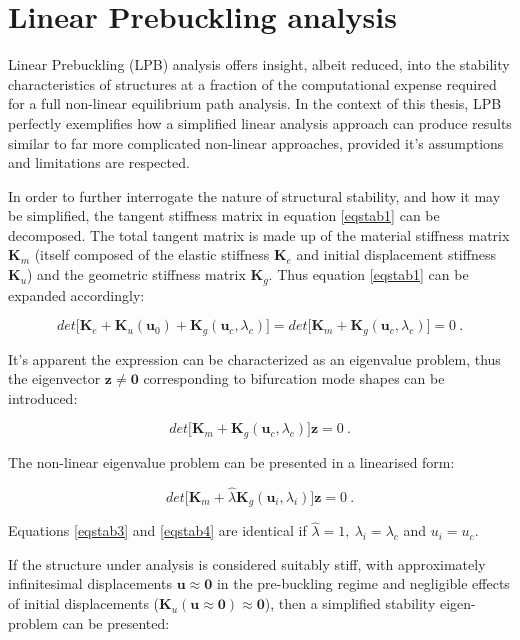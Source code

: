 \section{Linear Prebuckling analysis}
Linear Prebuckling (LPB) analysis offers insight, albeit reduced, into the stability characteristics of structures at a fraction of the computational expense required for a full non-linear equilibrium path analysis. In the context of this thesis, LPB perfectly exemplifies how a simplified linear analysis approach can produce results similar to far more complicated non-linear approaches, provided it's assumptions and limitations are respected.

In order to further interrogate the nature of structural stability, and how it may be simplified, the tangent stiffness matrix in equation \ref{eqstab1} can be decomposed. The total tangent matrix is made up of the material stiffness matrix $\mathbf{K}_m$ (itself composed of the elastic stiffness $\mathbf{K}_e$ and initial displacement stiffness $\mathbf{K}_u$) and the geometric stiffness matrix $\mathbf{K}_g$. Thus equation \ref{eqstab1} can be expanded accordingly:

\begin{equation} 
det\big[
\mathbf{K}_e +
\mathbf{K}_u(\mathbf{u}_0) +
\mathbf{K}_g(\mathbf{u}_c,\lambda_c)
\big] = 
det\big[
\mathbf{K}_m +
\mathbf{K}_g(\mathbf{u}_c,\lambda_c)
\big] = 0
\label{eqstab2}\ .
\end{equation}

It's apparent the expression can be characterized as an eigenvalue problem, thus the eigenvector $\mathbf{z} \neq \mathbf{0}$ corresponding to bifurcation mode shapes can be introduced:

\begin{equation} 
det\big[
\mathbf{K}_m +
\mathbf{K}_g(\mathbf{u}_c,\lambda_c)
\big]\mathbf{z} = 0
\label{eqstab3}\ .
\end{equation}

The non-linear eigenvalue problem can be presented in a linearised form:

\begin{equation} 
det\big[
\mathbf{K}_m +
\hat{\lambda}
\mathbf{K}_g(\mathbf{u}_i,\lambda_i)
\big]\mathbf{z} = 0
\label{eqstab4}\ .
\end{equation}

Equations \ref{eqstab3} and \ref{eqstab4} are identical if $\hat{\lambda}
 = 1,\ \lambda_i = \lambda_c$ and $u_i = u_c$.
 
 If the structure under analysis is considered suitably stiff, with approximately infinitesimal displacements $\mathbf{u} \approx \mathbf{0}$ in the pre-buckling regime and negligible effects of initial displacements ($\mathbf{K}_u(\mathbf{u} \approx \mathbf{0}) \approx \mathbf{0}$), then a simplified stability eigen-problem can be presented:
 
